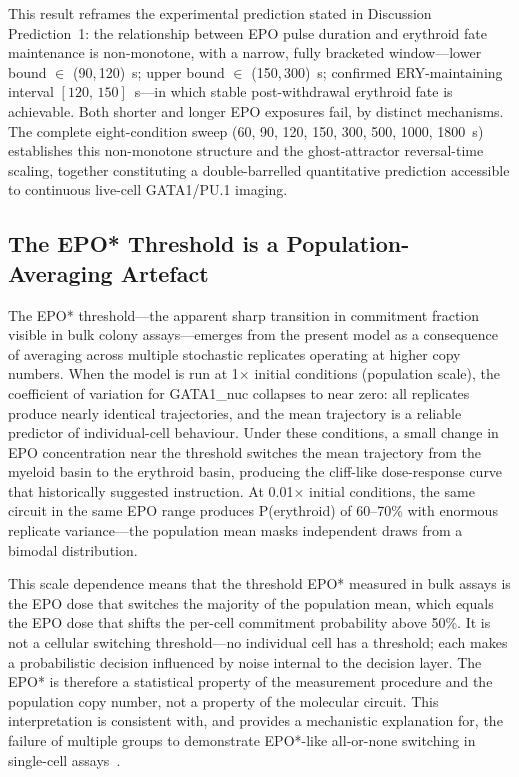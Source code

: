 This result reframes the experimental prediction stated in Discussion Prediction~1: the relationship between EPO pulse duration and erythroid fate maintenance is non-monotone, with a narrow, fully bracketed window---lower bound $\in$ (90,\,120)~s; upper bound $\in$ (150,\,300)~s; confirmed ERY-maintaining interval $[120,\,150]$~s---in which stable post-withdrawal erythroid fate is achievable. Both shorter and longer EPO exposures fail, by distinct mechanisms. The complete eight-condition sweep (60, 90, 120, 150, 300, 500, 1000, 1800~s) establishes this non-monotone structure and the ghost-attractor reversal-time scaling, together constituting a double-barrelled quantitative prediction accessible to continuous live-cell GATA1/PU.1 imaging.

\subsection{The EPO* Threshold is a Population-Averaging Artefact}

The EPO* threshold---the apparent sharp transition in commitment fraction visible in bulk colony assays---emerges from the present model as a consequence of averaging across multiple stochastic replicates operating at higher copy numbers. When the model is run at 1$\times$ initial conditions (population scale), the coefficient of variation for GATA1\_nuc collapses to near zero: all replicates produce nearly identical trajectories, and the mean trajectory is a reliable predictor of individual-cell behaviour. Under these conditions, a small change in EPO concentration near the threshold switches the mean trajectory from the myeloid basin to the erythroid basin, producing the cliff-like dose-response curve that historically suggested instruction. At 0.01$\times$ initial conditions, the same circuit in the same EPO range produces P(erythroid) of 60--70\% with enormous replicate variance---the population mean masks independent draws from a bimodal distribution.

This scale dependence means that the threshold EPO* measured in bulk assays is the EPO dose that switches the majority of the population mean, which equals the EPO dose that shifts the per-cell commitment probability above 50\%. It is not a cellular switching threshold---no individual cell has a threshold; each makes a probabilistic decision influenced by noise internal to the decision layer. The EPO* is therefore a statistical property of the measurement procedure and the population copy number, not a property of the molecular circuit. This interpretation is consistent with, and provides a mechanistic explanation for, the failure of multiple groups to demonstrate EPO*-like all-or-none switching in single-cell assays~\cite{hoppe2016,olsson2016}.

